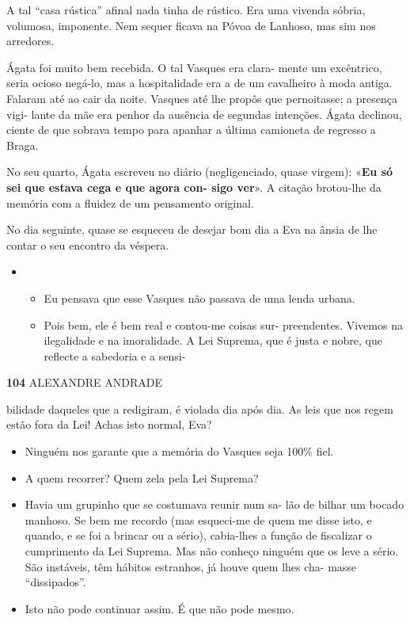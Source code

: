A tal ``casa rústica'' afinal nada tinha de rústico. Era uma vivenda
sóbria, volumosa, imponente. Nem sequer ficava na Póvoa de Lanhoso, mas
sim nos arredores.

Ágata foi muito bem recebida. O tal Vasques era clara- mente um
excêntrico, seria ocioso negá-lo, mas a hospitalidade era a de um
cavalheiro à moda antiga. Falaram até ao cair da noite. Vasques até lhe
propôs que pernoitasse; a presença vigi- lante da mãe era penhor da
ausência de segundas intenções. Ágata declinou, ciente de que sobrava
tempo para apanhar a última camioneta de regresso a Braga.

No seu quarto, Ágata escreveu no diário (negligenciado, quase virgem):
«\textbf{Eu só sei que estava cega e que agora con- sigo ver}». A
citação brotou-lhe da memória com a fluidez de um pensamento original.

No dia seguinte, quase se esqueceu de desejar bom dia a Eva na ânsia de
lhe contar o seu encontro da véspera.

\begin{itemize}
\item
  \begin{itemize}
  \tightlist
  \item
    Eu pensava que esse Vasques não passava de uma lenda urbana.
  \item
    Pois bem, ele é bem real e contou-me coisas sur- preendentes.
    Vivemos na ilegalidade e na imoralidade. A Lei Suprema, que é justa
    e nobre, que reflecte a sabedoria e a sensi-
  \end{itemize}
\end{itemize}

\textbf{104 }ALEXANDRE ANDRADE

bilidade daqueles que a redigiram, é violada dia após dia. As leis que
nos regem estão fora da Lei! Achas isto normal, Eva?

\begin{itemize}
\tightlist
\item
  Ninguém nos garante que a memória do Vasques seja 100\% fiel.
\item
  A quem recorrer? Quem zela pela Lei Suprema?
\item
  Havia um grupinho que se costumava reunir num sa- lão de bilhar um
  bocado manhoso. Se bem me recordo (mas esqueci-me de quem me disse
  isto, e quando, e se foi a brincar ou a sério), cabia-lhes a função de
  fiscalizar o cumprimento da Lei Suprema. Mas não conheço ninguém que
  os leve a sério. São instáveis, têm hábitos estranhos, já houve quem
  lhes cha- masse ``dissipados''.
\item
  Isto não pode continuar assim. É que não pode mesmo.
\end{itemize}

